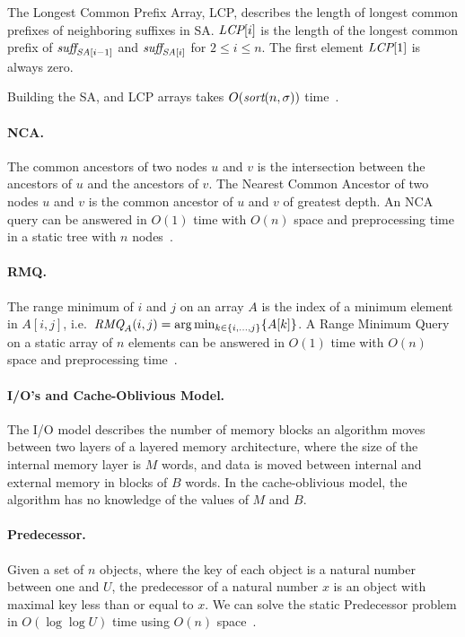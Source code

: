 \documentclass[a4]{article}
\begin{document}
The Longest Common Prefix Array, LCP, describes the length of longest common prefixes of neighboring suffixes in SA. $\textit{LCP}[i]$ is the length of the longest common prefix of $\textit{suff}_{\textit{SA}[i-1]}$ and $\textit{suff}_{\textit{SA}[i]}$ for $2 \leq i \leq n$. The first element $\textit{LCP}[1]$ is always zero.

Building the SA, \SAi and LCP arrays takes $O(\textit{sort}(n,\sigma))$ time~\cite{sort-complexity}.

\paragraph{NCA.} The common ancestors of two nodes $u$ and $v$ is the intersection between the ancestors of $u$ and the ancestors of $v$. The Nearest Common Ancestor of two nodes $u$ and $v$ is the common ancestor of $u$ and $v$ of greatest depth. An NCA query can be answered in $O(1)$ time with $O(n)$ space and preprocessing time in a static tree with $n$ nodes~\cite{nca}.

\paragraph{RMQ.} The range minimum of $i$ and $j$ on an array $A$ is the index of a minimum element in $A[i,j]$, i.e.\ $\textit{RMQ}_A(i,j) = \arg \min_{k\in\{i,...,j\}}\{A[k]\}$. A Range Minimum Query on a static array of $n$ elements can be answered in $O(1)$ time with $O(n)$ space and preprocessing time~\cite{jf-rmq}.

\ifreport

\paragraph{I/O's and Cache-Oblivious Model.}
The I/O model describes the number of memory blocks an algorithm moves between two layers of a layered memory architecture, where the size of the internal memory layer is $M$ words, and data is moved between internal and external memory in blocks of $B$ words. In the cache-oblivious model, the algorithm has no knowledge of the values of $M$ and $B$.

\paragraph{Predecessor.}
Given a set of $n$ objects, where the key of each object is a natural number between one and $U$, the predecessor of a natural number $x$ is an object with maximal key less than or equal to $x$. We can solve the static Predecessor problem in $O(\log\log U)$ time using $O(n)$ space~\cite{predecessor}.
\end{document}
